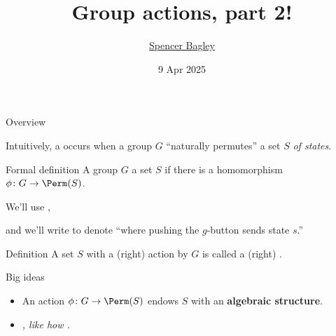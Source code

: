 \documentclass[8pt, handout]{beamer}
\title[Group actions, part 2!]{Group actions, part 2!}
\author[\href{mailto:sbagley@westminsteru.edu}{S. Bagley}]
       {\href{mailto:sbagley@westminsteru.edu}{Spencer Bagley}}
\institute[Westminster] { 
  \normalsize With many thanks to Matthew Macauley, \\
  \url{http://www.math.clemson.edu/~macaule/}}
\date[9 Apr 2025]{9 Apr 2025}
\newcommand{\Pause}{}      %
\begin{document}
\frame{\titlepage}


\begin{frame}{Overview} %

  Intuitively, a  occurs when a group $G$
  ``naturally permutes'' a set $S$ \emph{of states}.

  \medskip\pause

  \begin{block}{Formal definition}
    A group $G$  a set $S$ if there is a homomorphism
    $\phi\colon G\to\Perm(S)$. \pause

    We'll use ,
    
    and we'll write  to denote ``where pushing the $g$-button sends state $s$.''
  \end{block} \pause

  \begin{block}{Definition}
    A set $S$ with a (right) action by $G$ is called a (right)
    .
  \end{block} \pause
  
  \begin{alertblock}{Big ideas}
   \begin{itemize}
    \item An action $\phi\colon G\to\Perm(S)$ endows $S$ with an
      \textbf{algebraic structure}. \pause
    \item \emph{, like how
      .}
    \end{itemize}
  \end{alertblock}
  
\end{frame}

\end{document}
